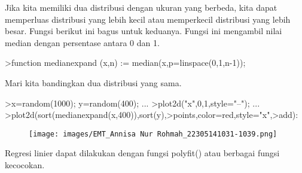 \documentclass[a4paper,10pt]{article}
\begin{document}
\begin{eulernotebook}
\begin{eulercomment}
\begin{eulercomment}
\begin{eulercomment}
\begin{eulercomment}
\begin{eulercomment}
Jika kita memiliki dua distribusi dengan ukuran yang berbeda, kita
dapat memperluas distribusi yang lebih kecil atau memperkecil
distribusi yang lebih besar. Fungsi berikut ini bagus untuk keduanya.
Fungsi ini mengambil nilai median dengan persentase antara 0 dan 1.
\end{eulercomment}
\begin{eulerprompt}
>function medianexpand (x,n) := median(x,p=linspace(0,1,n-1));
\end{eulerprompt}
\begin{eulercomment}
Mari kita bandingkan dua distribusi yang sama.
\end{eulercomment}
\begin{eulerprompt}
>x=random(1000); y=random(400); ...
>plot2d("x",0,1,style="--"); ...
>plot2d(sort(medianexpand(x,400)),sort(y),>points,color=red,style="x",>add):
\end{eulerprompt}
\begin{figure}[h]
    \centering
    \texttt{[image: images/EMT\_Annisa Nur Rohmah\_22305141031-1039.png]}
\end{figure}
\begin{eulercomment}
Regresi linier dapat dilakukan dengan fungsi polyfit() atau berbagai
fungsi kecocokan.


\end{eulercomment}
\end{eulercomment}
\end{eulercomment}
\end{eulercomment}
\end{eulercomment}
\end{eulernotebook}
\end{document}
